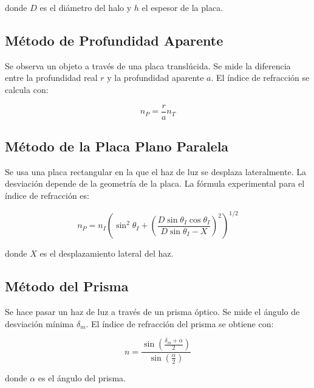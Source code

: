 \documentclass[article,12pt]{elsarticle}
\begin{document}
donde $D$ es el diámetro del halo y $h$ el espesor de la placa.

\subsection{Método de Profundidad Aparente} \cite{indice_ref}
Se observa un objeto a través de una placa translúcida. Se mide la diferencia entre la profundidad real $r$ y la profundidad aparente $a$. El índice de refracción se calcula con:

\begin{mdframed}
\label{P.A}
\begin{equation}
    n_P = \frac{r}{a} n_T
\end{equation}
\end{mdframed}

\subsection{Método de la Placa Plano Paralela} \cite{indice_ref}
Se usa una placa rectangular en la que el haz de luz se desplaza lateralmente. La desviación depende de la geometría de la placa. La fórmula experimental para el índice de refracción es:

\begin{mdframed}
\label{PPP}
\begin{equation}
    n_P = n_I \left(\sin^2\theta_I + \left(\frac{D \sin\theta_I \cos\theta_I}{D \sin\theta_I - X} \right)^2\right)^{1/2}
\end{equation}
\end{mdframed}

donde $X$ es el desplazamiento lateral del haz.

\subsection{Método del Prisma} \cite{indice_ref}
Se hace pasar un haz de luz a través de un prisma óptico. Se mide el ángulo de desviación mínima $\delta_m$. El índice de refracción del prisma se obtiene con:

\begin{mdframed}
\label{Prisma}
\begin{equation}
    n = \frac{\sin\left(\frac{\delta_m + \alpha}{2} \right)}{\sin\left(\frac{\alpha}{2}\right)}
\end{equation}
\end{mdframed}

donde $\alpha$ es el ángulo del prisma.
\end{document}
